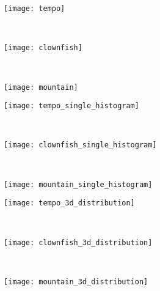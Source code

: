 \begin{figure}[!ht]
    \centering
    \begin{subfigure}[t]{\textwidth+20pt\relax}
    	\texttt{[image: tempo]}
    \end{subfigure}~ 
    \begin{subfigure}[b]{0.32\textwidth}
        \texttt{[image: clownfish]}
    \end{subfigure}~
    \begin{subfigure}[b]{0.32\textwidth}
        \texttt{[image: mountain]}
    \end{subfigure}\vspace{10pt}
    
    \begin{subfigure}[t]{\textwidth+20pt\relax}
    	\texttt{[image: tempo\_single\_histogram]}
    \end{subfigure}~     
    \begin{subfigure}[b]{0.32\textwidth}
        \texttt{[image: clownfish\_single\_histogram]}
    \end{subfigure}~
    \begin{subfigure}[b]{0.32\textwidth}
        \texttt{[image: mountain\_single\_histogram]}
    \end{subfigure}\vspace{10pt}
    
    \begin{subfigure}[t]{\textwidth+20pt\relax}
    	\texttt{[image: tempo\_3d\_distribution]}
    \end{subfigure}~ 
    \begin{subfigure}[b]{0.32\textwidth}
        \texttt{[image: clownfish\_3d\_distribution]}
    \end{subfigure}~
    \begin{subfigure}[b]{0.32\textwidth}
        \texttt{[image: mountain\_3d\_distribution]}
    \end{subfigure}\vspace{10pt}
    

\end{figure}
